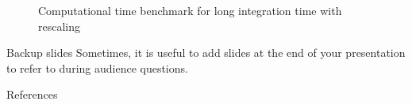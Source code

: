 \documentclass{beamer}
\begin{document}
\begin{frame}
	\begin{figure}
		
		\caption{Computational time benchmark for long integration time with rescaling}
	\end{figure}
\end{frame}


\begin{frame}[fragile]{Backup slides}
  Sometimes, it is useful to add slides at the end of your presentation to
  refer to during audience questions.


\end{frame}

\begin{frame}[allowframebreaks]{References}

  
  

\end{frame}
\end{document}
